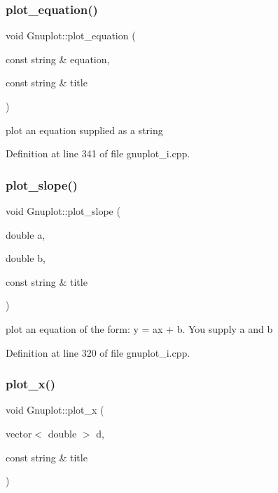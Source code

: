 \subsubsection{\texorpdfstring{plot\+\_\+equation()}{plot\_equation()}}
{\footnotesize\ttfamily void Gnuplot\+::plot\+\_\+equation (\begin{DoxyParamCaption}\item[{const string \&}]{equation,  }\item[{const string \&}]{title }\end{DoxyParamCaption})}



plot an equation supplied as a string 



Definition at line 341 of file gnuplot\+\_\+i.\+cpp.

\mbox{\label{class_gnuplot_a80c9d9e6bc3e64db073d9d39d6ec5d5f}} 
\subsubsection{\texorpdfstring{plot\+\_\+slope()}{plot\_slope()}}
{\footnotesize\ttfamily void Gnuplot\+::plot\+\_\+slope (\begin{DoxyParamCaption}\item[{double}]{a,  }\item[{double}]{b,  }\item[{const string \&}]{title }\end{DoxyParamCaption})}



plot an equation of the form\+: y = ax + b. You supply a and b 



Definition at line 320 of file gnuplot\+\_\+i.\+cpp.

\mbox{\label{class_gnuplot_ae3b7c28efb53f636431b9655085906be}} 
\subsubsection{\texorpdfstring{plot\+\_\+x()}{plot\_x()}}
{\footnotesize\ttfamily void Gnuplot\+::plot\+\_\+x (\begin{DoxyParamCaption}\item[{vector$<$ double $>$}]{d,  }\item[{const string \&}]{title }\end{DoxyParamCaption})}




